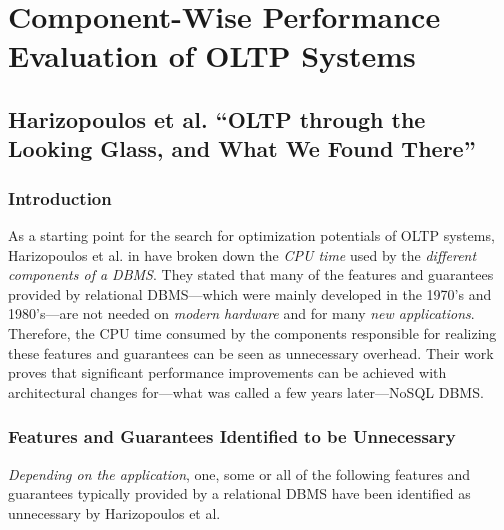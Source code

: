 \chapter{Component-Wise Performance Evaluation of OLTP Systems} \label{ch:looking_glass}

\section{Harizopoulos et al. ``OLTP through the Looking Glass, and What We Found There''} \label{sec:paper}

\subsection{Introduction}

    As a starting point for the search for optimization potentials of OLTP systems, Harizopoulos et al. in \cite{Harizopoulos:2008} have broken down the \emph{CPU time} used by the \emph{different components of a DBMS}. They stated that many of the features and guarantees provided by relational DBMS---which were mainly developed in the 1970's and 1980's---are not needed on \emph{modern hardware} and for many \emph{new applications}. Therefore, the CPU time consumed by the components responsible for realizing these features and guarantees can be seen as unnecessary overhead. Their work proves that significant performance improvements can be achieved with architectural changes for---what was called a few years later---NoSQL DBMS.

\subsection{Features and Guarantees Identified to be Unnecessary}

    \emph{Depending on the application}, one, some or all of the following features and guarantees typically provided by a relational DBMS have been identified as unnecessary by Harizopoulos et al.

